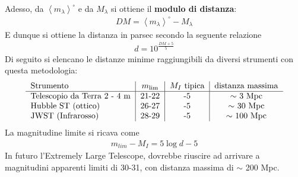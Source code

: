 \documentclass[a4paper, oneside]{book}
\begin{document}
Adesso, da $\left< m_\lambda \right>^{\circ}$ e da $M_\lambda$ si ottiene il \textbf{modulo di distanza}:
\begin{align}
    DM = \left< m_\lambda \right>^{\circ} - M_\lambda
\end{align}
E dunque si ottiene la distanza in parsec secondo la seguente relazione
\begin{align}
    d = 10^{\frac{DM + 5}{5}}
\end{align}
Di seguito si elencano le distanze minime raggiungibili da diversi strumenti con questa metodologia:
\begin{gather*}
    \begin{tabular}{l | c | c | c}
        Strumento & $m_{\text{lim}}$ & $M_I$ tipica & \text{distanza massima}\\
        \hline
        Telescopio da Terra 2 - 4 m & 21-22 & -5 & $\sim$ 3 Mpc \\
        Hubble ST (ottico) & 26-27 & -5 & $\sim$ 30 Mpc \\
        JWST (Infrarosso) & 28-29 & -5 & $\sim$ 100 Mpc
    \end{tabular}
\end{gather*}
La magnitudine limite si ricava come 
\begin{align}
    m_{lim} - M_I = 5\log d - 5
\end{align}
In futuro l'Extremely Large Telescope, dovrebbe riuscire ad arrivare a magnitudini apparenti 
limiti di 30-31, con distanza massima di $\sim$ 200 Mpc. 
\end{document}
